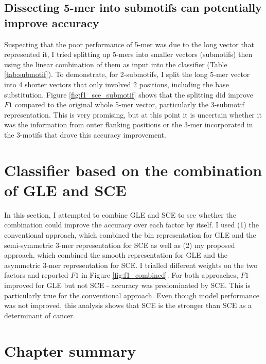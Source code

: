 \subsection{Dissecting 5-mer into submotifs can potentially improve accuracy}
Suspecting that the poor performance of 5-mer was due to the long vector that represented it, I tried splitting up 5-mers into smaller vectors (submotifs) then using the linear combination of them as input into the classifier (Table \ref{tab:submotif}). To demonstrate, for 2-submotifs, I split the long 5-mer vector into 4 shorter vectors that only involved 2 positions, including the base substitution. Figure \ref{fig:f1_sce_submotif} shows that the splitting did improve $F1$ compared to the original whole 5-mer vector, particularly the 3-submotif representation. This is very promising, but at this point it is uncertain whether it was the information from outer flanking positions or the 3-mer incorporated in the 3-motifs that drove this accuracy improvement.



\section{Classifier based on the combination of GLE and SCE}\label{ml:both}
In this section, I attempted to combine GLE and SCE to see whether the combination could improve the accuracy over each factor by itself. I used (1) the conventional approach, which combined the bin representation for GLE and the semi-symmetric 3-mer representation for SCE as well as (2) my proposed approach, which combined the smooth representation for GLE and the asymmetric 3-mer representation for SCE. I trialled different weights on the two factors and reported $F1$ in Figure \ref{fig:f1_combined}. For both approaches, $F1$ improved for GLE but not SCE - accuracy was predominated by SCE. This is particularly true for the conventional approach. Even though model performance was not improved, this analysis shows that SCE is the stronger than SCE as a determinant of cancer.



\section{Chapter summary}